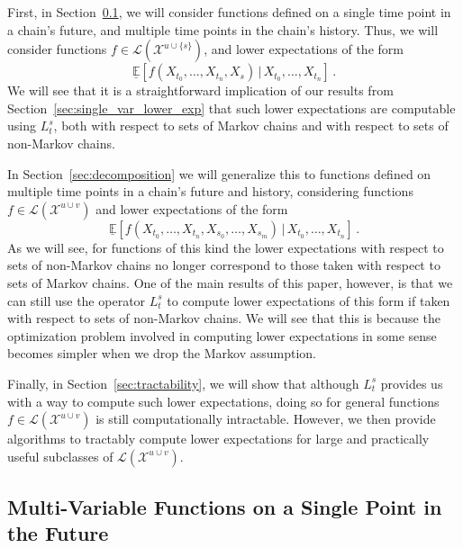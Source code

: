 \documentclass[10pt]{paper}
\theoremstyle{definition}
\newcommand{\states}{\mathcal{X}}
\newcommand{\gambles}{\mathcal{L}}
\begin{document}
First, in Section~\ref{sec:function_single_future_multiple_past}, we will consider functions defined on a single time point in a chain's future, and multiple time points in the chain's history. Thus, we will consider functions $f\in\gambles(\states^{u\cup\{s\}})$, and lower expectations of the form
\begin{equation*}
\underline{\mathbb{E}}\left[f(X_{t_0},\ldots,X_{t_n},X_s)\,\vert\,X_{t_0},\ldots,X_{t_n}\right]\,.
\end{equation*}
We will see that it is a straightforward implication of our results from Section~\ref{sec:single_var_lower_exp} that such lower expectations are computable using $L_t^s$, both with respect to sets of Markov chains and with respect to sets of non-Markov chains.

In Section~\ref{sec:decomposition} we will generalize this to functions defined on multiple time points in a chain's future and history, considering functions $f\in\gambles(\states^{u\cup v})$ and lower expectations of the form
\begin{equation*}
\underline{\mathbb{E}}\left[f(X_{t_0},\ldots,X_{t_n},X_{s_0},\ldots,X_{s_m})\,\vert\,X_{t_0},\ldots,X_{t_n}\right]\,.
\end{equation*}
As we will see, for functions of this kind the lower expectations with respect to sets of non-Markov chains no longer correspond to those taken with respect to sets of Markov chains. One of the main results of this paper, however, is that we can still use the operator $L_t^s$ to compute lower expectations of this form if taken with respect to sets of non-Markov chains. We will see that this is because the optimization problem involved in computing lower expectations in some sense becomes simpler when we drop the Markov assumption.

Finally, in Section~\ref{sec:tractability}, we will show that although $L_t^s$ provides us with a way to compute such lower expectations, doing so for general functions $f\in\gambles(\states^{u\cup v})$ is still computationally intractable. However, we then provide algorithms to tractably compute lower expectations for large and practically useful subclasses of $\gambles(\states^{u\cup v})$.

\subsection{Multi-Variable Functions on a Single Point in the Future}\label{sec:function_single_future_multiple_past}
\end{document}
